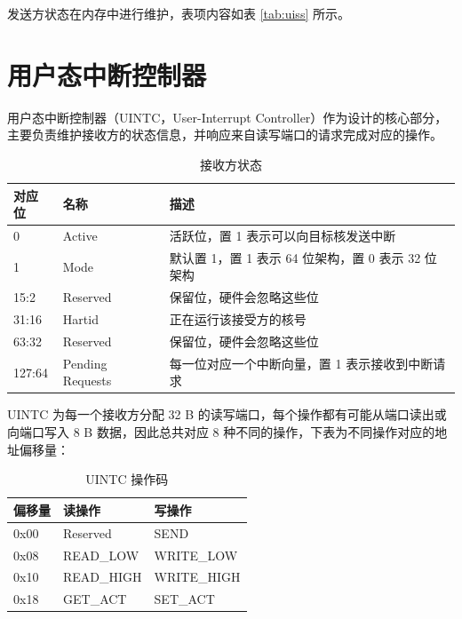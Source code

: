 发送方状态在内存中进行维护，表项内容如表 \ref{tab:uiss} 所示。

\section{用户态中断控制器}

用户态中断控制器（UINTC，User-Interrupt Controller）作为设计的核心部分，主要负责维护接收方的状态信息，并响应来自读写端口的请求完成对应的操作。

\begin{table}
    \centering
    \begin{threeparttable}[c]
        \begin{tabular}{|l|l|l|}
            \hline
            对应位 & 名称 & 描述 \\
            \hline
            0 & Active & 活跃位，置 1 表示可以向目标核发送中断 \\
            \hline
            1 & Mode & 默认置 1，置 1 表示 64 位架构，置 0 表示 32 位架构 \\
            \hline
            15:2 & Reserved & 保留位，硬件会忽略这些位 \\
            \hline
            31:16 & Hartid & 正在运行该接受方的核号 \\
            \hline
            63:32 & Reserved & 保留位，硬件会忽略这些位 \\
            \hline
            127:64 & Pending Requests & 每一位对应一个中断向量，置 1 表示接收到中断请求 \\
            \hline
        \end{tabular}
        \caption{接收方状态}
        \label{tab:uirs}
    \end{threeparttable}
\end{table}

UINTC 为每一个接收方分配 32 B 的读写端口，每个操作都有可能从端口读出或向端口写入 8 B 数据，因此总共对应 8 种不同的操作，下表为不同操作对应的地址偏移量：

\begin{table}
    \label{tab:uintc}
    \centering
    \begin{threeparttable}[c]
        \begin{tabular}{|l|l|l|}
            \hline
            偏移量 & 读操作 & 写操作 \\
            \hline
            0x00 & Reserved & SEND \\
            \hline
            0x08 & READ\_LOW & WRITE\_LOW \\
            \hline
            0x10 & READ\_HIGH & WRITE\_HIGH \\
            \hline
            0x18 & GET\_ACT & SET\_ACT \\
            \hline
        \end{tabular}
        \caption{UINTC 操作码}
    \end{threeparttable}
\end{table}

